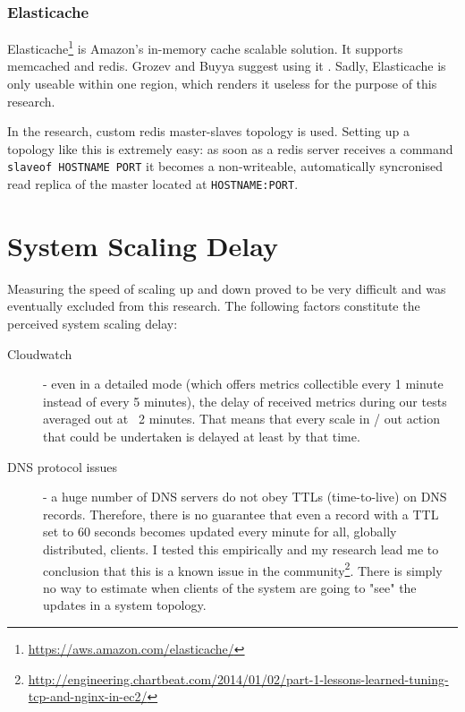 \documentclass{uvamscse}
\begin{document}
\subsubsection{Elasticache}

Elasticache\footnote{\url{https://aws.amazon.com/elasticache/}} is Amazon’s in-memory cache scalable solution. It supports memcached and redis. Grozev and Buyya suggest using it \cite{GroBuy}. Sadly, Elasticache is only useable within one region, which renders it useless for the purpose of this research.

In the research, custom redis master-slaves topology is used. Setting up a topology like this is extremely easy: as soon as a redis server receives a command \texttt{slaveof HOSTNAME PORT} it becomes a non-writeable, automatically syncronised read replica of the master located at \texttt{HOSTNAME:PORT}.

\section{System Scaling Delay}\label{System Scaling Delay}
Measuring the speed of scaling up and down proved to be very difficult and was eventually excluded from this research. The following factors constitute the perceived system scaling delay:
\begin{description}
  \item [Cloudwatch] - even in a detailed mode (which offers metrics collectible every 1 minute instead of every 5 minutes), the delay of received metrics during our tests averaged out at ~2 minutes. That means that every scale in / out action that could be undertaken is delayed at least by that time.
  \item [DNS protocol issues] - a huge number of DNS servers do not obey TTLs (time-to-live) on DNS records. Therefore, there is no guarantee that even a record with a TTL set to 60 seconds becomes updated every minute for all, globally distributed, clients. I tested this empirically and my research lead me to conclusion that this is a known issue in the community\footnote{\url{http://engineering.chartbeat.com/2014/01/02/part-1-lessons-learned-tuning-tcp-and-nginx-in-ec2/}}. There is simply no way to estimate when clients of the system are going to "see" the updates in a system topology.
\end{description}



\end{document}
